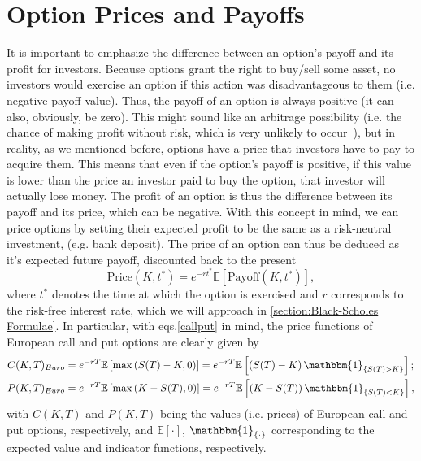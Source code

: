 \section{Option Prices and Payoffs}
It is important to emphasize the difference between an option's payoff and its profit for investors. Because options grant the right to buy/sell some asset, no investors would exercise an option if this action was disadvantageous to them (i.e. negative payoff value). Thus, the payoff of an option is always positive (it can also, obviously, be zero). This might sound like an arbitrage possibility (i.e. the chance of making profit without risk, which is very unlikely to occur~\citep{Wilmott}), but in reality, as we mentioned before, options have a price that investors have to pay to acquire them. This means that even if the option's payoff is positive, if this value is lower than the price an investor paid to buy the option, that investor will actually lose money. The profit of an option is thus the difference between its payoff and its price, which can be negative.
With this concept in mind, we can price options by setting their expected profit to be the same as a risk-neutral investment, (e.g. bank deposit). The price of an option can thus be deduced as it's expected future payoff, discounted back to the present
\begin{equation}\label{pricepayoff}
\text{Price}(K,t^*)=e^{-rt^*}\mathbb{E}\left[\text{Payoff}(K,t^*)\right],
\end{equation}
\noindent where $t^*$ denotes the time at which the option is exercised and $r$ corresponds to the risk-free interest rate, which we will approach in \autoref{section:Black-Scholes Formulae}.
In particular, with eqs.\eqref{callput} in mind, the price functions of European call and put options are clearly given by
\begin{subequations}\label{callprice}
\begin{align}
&C(K,T)_{Euro}=e^{-rT}\mathbb{E}\left[\max\left(S(T)-K,0\right)\right]=e^{-rT}\mathbb{E}\left[\left(S(T)-K\right)\mathbbm{1}_{\left\{S(T)>K\right\}}\right];\\
&P(K,T)_{Euro}=e^{-rT}\mathbb{E}\left[\max\left(K-S(T),0\right)\right]=e^{-rT}\mathbb{E}\left[\left(K-S(T)\right)\mathbbm{1}_{\left\{S(T)<K\right\}}\right],
\end{align}
\end{subequations}
\noindent with $C(K,T)$ and $P(K,T)$ being the values (i.e. prices) of European call and put options, respectively, and $\mathbb{E}[\cdot]$, $\mathbbm{1}_{\{\cdot\}}$ corresponding to the expected value and indicator functions, respectively.

